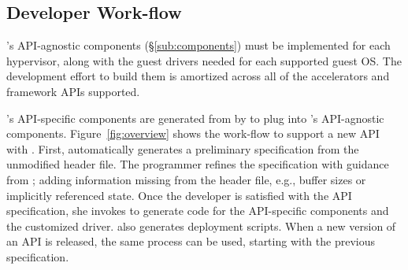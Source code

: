 \begin{comment}
\cjr{I think we've made the point already, and we need the space.}
The router and the specialized transport that enables it distinguishes \AvA from API remoting and allows \AvA to support hypervisor level interposition.\amp{might be a strawman. Someone please check and rewrite.}
The router, the \worker, and vendor
device drivers are considered part of the Trusted Computing Base, while the
guest library and the guest \vdev driver are untrusted.

\cjr{Anyone: Add sentence saying exactly how these components are different from traditional API remoting?}
\end{comment}

\subsection{Developer Work-flow}
\label{sub:workflow}

\AvA's API-agnostic components (\S\ref{sub:components}) must be implemented for each hypervisor, along with the guest drivers
needed for each supported guest OS. The development effort to build them
is amortized across all of the accelerators and framework APIs supported.

\AvA's API-specific components are generated from \Lapis by \CAvA to
plug into \AvA's API-agnostic components.
Figure~\ref{fig:overview} shows the work-flow to support a new API with \AvA.
First, \CAvA automatically generates a preliminary \Lapis specification from the unmodified header file.
The programmer refines the specification with guidance from \CAvA; adding information missing from the header file, e.g., buffer sizes or implicitly referenced state.
Once the developer is satisfied with the API specification, she invokes
\CAvA to generate code for the API-specific components and the customized
driver. \CAvA also generates deployment scripts.
When a new version of an API is released, the same process can be used, starting with the previous specification.
